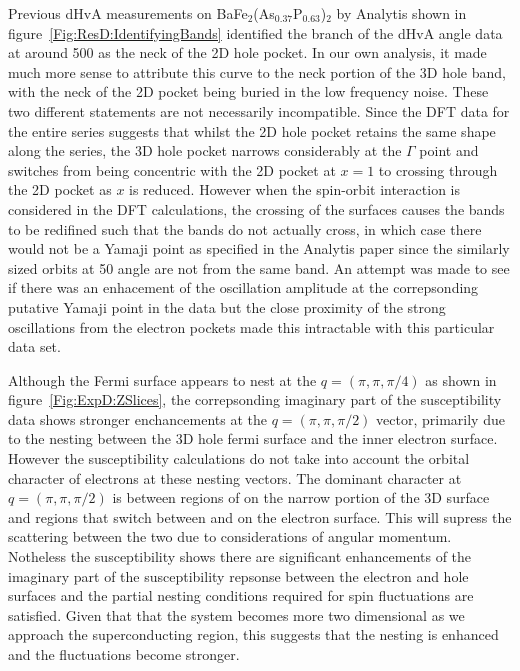 Previous \ac{dHvA} measurements on BaFe$_2$(As$_{0.37}$P$_{0.63}$)$_2$ by Analytis \etal shown in figure~\ref{Fig:ResD:IdentifyingBands} identified the branch of the \ac{dHvA} angle data at around \unit{500}{\tesla} as the neck of the 2D hole pocket. In our own analysis, it made much more sense to attribute this curve to the neck portion of the 3D hole band, with the neck of the 2D pocket being buried in the low frequency noise. These two different statements are not necessarily incompatible. Since the \ac{DFT} data for the entire series suggests that whilst the 2D hole pocket retains the same shape along the \BaFePAs series, the 3D hole pocket narrows considerably at the $\Gamma$ point and switches from being concentric with the 2D pocket at $x=1$ to crossing through the 2D pocket as $x$ is reduced. However when the spin-orbit interaction is considered in the \ac{DFT} calculations, the crossing of the surfaces causes the bands to be redifined such that the bands do not actually cross, in which case there would not be a Yamaji point as specified in the Analytis paper since the similarly sized orbits at \unit{50}{\degree} angle are not from the same band. An attempt was made to see if there was an enhacement of the oscillation amplitude at the correpsonding putative Yamaji point in the \BaFeP data but the close proximity of the strong oscillations from the electron pockets made this intractable with this particular data set.

Although the Fermi surface appears to nest at the $q=(\pi, \pi, \pi/4)$ as shown in figure~\ref{Fig:ExpD:ZSlices}, the correpsonding imaginary part of the susceptibility data shows stronger enchancements at the $q=(\pi, \pi, \pi/2)$ vector, primarily due to the nesting between the 3D hole fermi surface and the inner electron surface. However the susceptibility calculations do not take into account the orbital character of electrons at these nesting vectors. The dominant character at $q=(\pi, \pi, \pi/2)$ is between regions of \DxzDyz on the narrow portion of the 3D surface and regions that switch between \Dxy and \DxzDyz on the electron surface. This will supress the scattering between the two due to considerations of angular momentum. Notheless the susceptibility shows there are significant enhancements of the imaginary part of the susceptibility repsonse between the electron and hole surfaces and the partial nesting conditions required for spin fluctuations are satisfied. Given that that the system becomes more two dimensional as we approach the superconducting region, this suggests that the nesting is enhanced and the fluctuations become stronger.


